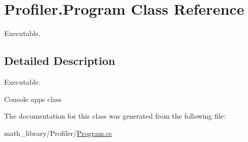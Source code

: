 \hypertarget{classProfiler_1_1Program}{}\section{Profiler.\+Program Class Reference}
\label{classProfiler_1_1Program}


Executable.  




\subsection{Detailed Description}
Executable. 

Console app\textquotesingle{}s class 

The documentation for this class was generated from the following file\+:\begin{DoxyCompactItemize}
\item 
math\+\_\+library/\+Profiler/\hyperlink{math__library_2Profiler_2Program_8cs}{Program.\+cs}\end{DoxyCompactItemize}
